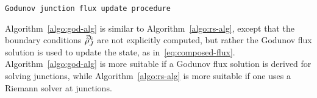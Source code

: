 \begin{algorithm}[t]
\caption{\texttt{Godunov junction flux update procedure}}



\end{algorithm}


Algorithm~\ref{algo:god-alg} is similar to Algorithm~\ref{algo:rs-alg},
except that the boundary conditions $\vec{\hat{\rho}}_{J}^{k}$ are
not explicitly computed, but rather the Godunov flux solution is used
to update the state, as in~\ref{eq:composed-flux}. Algorithm~\ref{algo:god-alg}
is more suitable if a Godunov flux solution is derived for solving
junctions, while Algorithm~\ref{algo:rs-alg} is more suitable if
one uses a Riemann solver at junctions.